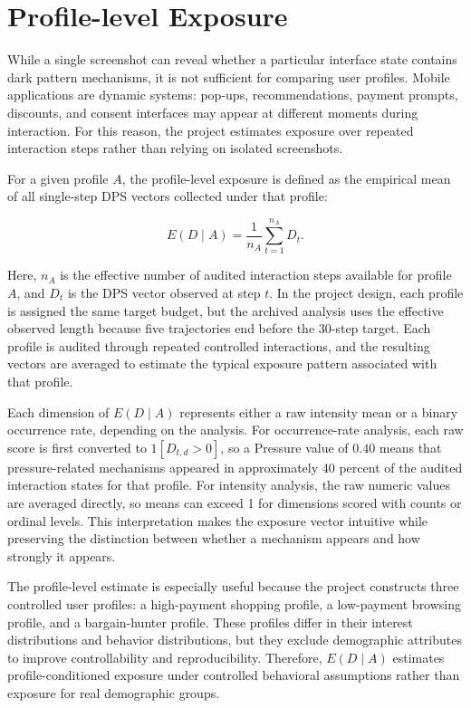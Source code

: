 \section{Profile-level Exposure}

While a single screenshot can reveal whether a particular interface state contains dark pattern mechanisms, it is not sufficient for comparing user profiles. Mobile applications are dynamic systems: pop-ups, recommendations, payment prompts, discounts, and consent interfaces may appear at different moments during interaction. For this reason, the project estimates exposure over repeated interaction steps rather than relying on isolated screenshots.

For a given profile \(A\), the profile-level exposure is defined as the empirical mean of all single-step DPS vectors collected under that profile:

\[
E(D \mid A) = \frac{1}{n_A}\sum_{t=1}^{n_A} D_t.
\]

Here, \(n_A\) is the effective number of audited interaction steps available for profile \(A\), and \(D_t\) is the DPS vector observed at step \(t\). In the project design, each profile is assigned the same target budget, but the archived analysis uses the effective observed length because five trajectories end before the 30-step target. Each profile is audited through repeated controlled interactions, and the resulting vectors are averaged to estimate the typical exposure pattern associated with that profile.

Each dimension of \(E(D \mid A)\) represents either a raw intensity mean or a binary occurrence rate, depending on the analysis. For occurrence-rate analysis, each raw score is first converted to \(1[D_{t,d}>0]\), so a Pressure value of \(0.40\) means that pressure-related mechanisms appeared in approximately 40 percent of the audited interaction states for that profile. For intensity analysis, the raw numeric values are averaged directly, so means can exceed 1 for dimensions scored with counts or ordinal levels. This interpretation makes the exposure vector intuitive while preserving the distinction between whether a mechanism appears and how strongly it appears.

The profile-level estimate is especially useful because the project constructs three controlled user profiles: a high-payment shopping profile, a low-payment browsing profile, and a bargain-hunter profile. These profiles differ in their interest distributions and behavior distributions, but they exclude demographic attributes to improve controllability and reproducibility. Therefore, \(E(D \mid A)\) estimates profile-conditioned exposure under controlled behavioral assumptions rather than exposure for real demographic groups.

